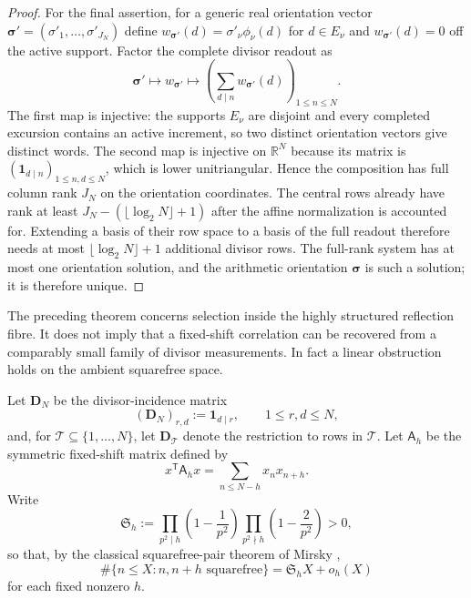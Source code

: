 \documentclass[11pt]{amsart}
\numberwithin{equation}{section}
\theoremstyle{plain}
\theoremstyle{definition}
\theoremstyle{remark}
\begin{document}
\begin{proof}
For the final assertion, for a generic real orientation vector
$\boldsymbol\sigma'=(\sigma'_1,\dots,\sigma'_{J_N})$ define
$w_{\boldsymbol\sigma'}(d)=\sigma'_\nu\phi_\nu(d)$ for $d\in E_\nu$ and
$w_{\boldsymbol\sigma'}(d)=0$ off the active support.  Factor the complete
divisor readout as
\[
\boldsymbol\sigma'
\longmapsto
w_{\boldsymbol\sigma'}
\longmapsto
\left(\sum_{d\mid n}w_{\boldsymbol\sigma'}(d)\right)_{1\le n\le N}.
\]
The first map is injective: the supports $E_\nu$ are disjoint and every
completed excursion contains an active increment, so two distinct
orientation vectors give distinct words.  The second map is injective on
$\mathbb R^N$ because its matrix is
$(\mathbf 1_{d\mid n})_{1\le n,d\le N}$, which is lower unitriangular.
Hence the composition has full
column rank $J_N$ on the orientation coordinates.  The central rows already
have rank at least
$J_N-(\lfloor\log_2N\rfloor+1)$ after the affine normalization is accounted
for.  Extending a basis of their row space to a basis of the full readout
therefore needs at most $\lfloor\log_2N\rfloor+1$ additional divisor rows.
The full-rank system has at most one orientation solution, and the arithmetic
orientation $\boldsymbol\sigma$ is such a solution; it is therefore unique.
\end{proof}

The preceding theorem concerns selection inside the highly structured reflection fibre.  It does not imply that a fixed-shift correlation can be recovered from a comparably small family of divisor measurements.  In fact a linear obstruction holds on the ambient squarefree space.

Let $\mathbf D_N$ be the divisor-incidence matrix
\[
(\mathbf D_N)_{r,d}:=\mathbf 1_{d\mid r},
\qquad 1\le r,d\le N,
\]
and, for $\mathcal T\subseteq\{1,\dots,N\}$, let $\mathbf D_\mathcal T$ denote the restriction to rows in $\mathcal T$.  Let $\mathsf A_h$ be the symmetric fixed-shift matrix defined by
\[
x^{\mathsf T}\mathsf A_hx
=
\sum_{n\le N-h}x_nx_{n+h}.
\]
Write
\begin{equation}
\mathfrak S_h
:=
\prod_{p^2\mid h}\left(1-\frac1{p^2}\right)
\prod_{p^2\nmid h}\left(1-\frac2{p^2}\right)>0,
\label{eq:mirsky-density-new}
\end{equation}
so that, by the classical squarefree-pair theorem of Mirsky \cite{Mirsky1949},
\[
\#\{n\le X:n,n+h\text{ squarefree}\}
=
\mathfrak S_hX+o_h(X)
\]
for each fixed nonzero $h$.
\end{document}

